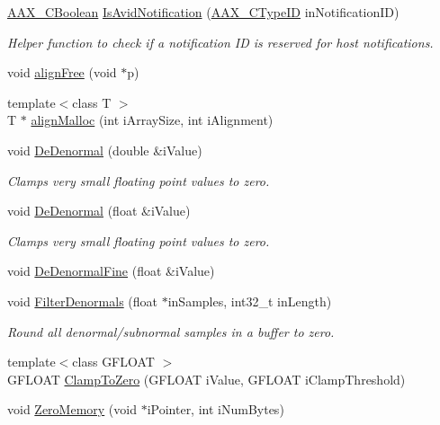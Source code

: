 \begin{DoxyCompactItemize}
\mbox{\hyperlink{a00392_aa216506530f1d19a2965931ced2b274b}{A\+A\+X\+\_\+\+C\+Boolean}} \mbox{\hyperlink{a00852_ab63efd791ab1cbbcdb004302b106c45c}{Is\+Avid\+Notification}} (\mbox{\hyperlink{a00392_ac678f9c1fbcc26315d209f71a147a175}{A\+A\+X\+\_\+\+C\+Type\+ID}} in\+Notification\+ID)
\begin{DoxyCompactList}\small\item\em Helper function to check if a notification ID is reserved for host notifications. \end{DoxyCompactList}\item 
void \mbox{\hyperlink{a00852_aa7d7e69902012a6272de3ea9aa0264a9}{align\+Free}} (void $\ast$p)
\item 
{\footnotesize template$<$class T $>$ }\\T $\ast$ \mbox{\hyperlink{a00852_aaa3236d90a0dbbf30150d8a181f2d66b}{align\+Malloc}} (int i\+Array\+Size, int i\+Alignment)
\item 
void \mbox{\hyperlink{a00852_aaf103dc75b68b6c4f6792dd26f9b4fd0}{De\+Denormal}} (double \&i\+Value)
\begin{DoxyCompactList}\small\item\em Clamps very small floating point values to zero. \end{DoxyCompactList}\item 
void \mbox{\hyperlink{a00852_aedfd1762f559291ceddd53f8ce8862a5}{De\+Denormal}} (float \&i\+Value)
\begin{DoxyCompactList}\small\item\em Clamps very small floating point values to zero. \end{DoxyCompactList}\item 
void \mbox{\hyperlink{a00852_ac52b6214a1de32e59b90ddbc1878e515}{De\+Denormal\+Fine}} (float \&i\+Value)
\item 
void \mbox{\hyperlink{a00852_a73dd9a17abecc28625c4d34279e4534f}{Filter\+Denormals}} (float $\ast$in\+Samples, int32\+\_\+t in\+Length)
\begin{DoxyCompactList}\small\item\em Round all denormal/subnormal samples in a buffer to zero. \end{DoxyCompactList}\item 
{\footnotesize template$<$class G\+F\+L\+O\+AT $>$ }\\G\+F\+L\+O\+AT \mbox{\hyperlink{a00852_a6b1f85f5d8c5837ff52212e13b84e6d0}{Clamp\+To\+Zero}} (G\+F\+L\+O\+AT i\+Value, G\+F\+L\+O\+AT i\+Clamp\+Threshold)
\item 
void \mbox{\hyperlink{a00852_ae9c9b3862c1b63dc4fb4e3c901d42935}{Zero\+Memory}} (void $\ast$i\+Pointer, int i\+Num\+Bytes)

\end{DoxyCompactItemize}
